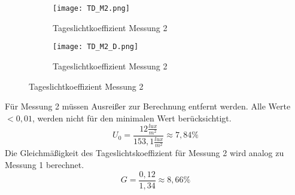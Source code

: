 \begin{figure}[H]
  \centering
  \begin{subfigure}[c]{0.5\textwidth}
      \texttt{[image: TD\_M2.png]}
      \caption{Tageslichtkoeffizient Messung 2}
      \label{fig:Tageslichtkoeffizient Messung 2}
  \end{subfigure}
  \hfill
  \begin{subfigure}[c]{0.4\textwidth}
      \texttt{[image: TD\_M2\_D.png]}
      \caption{Tageslichtkoeffizient Messung 2}
      \label{fig:Tageslichtkoeffizient Messung 2 Draufsicht}
  \end{subfigure}
  \label{fig:Messung 2 Tageslichtkoeffizient}
  \end{figure}
  Für Messung 2 müssen Ausreißer zur Berechnung entfernt werden. Alle Werte $<0,01$, werden nicht für den minimalen Wert berücksichtigt.
  $$U_0 = \frac{12\frac{lux}{m^2}}{153,1\frac{lux}{m^2}}\approx 7,84 \%$$
  Die Gleichmäßigkeit des Tageslichtskoeffizient für Messung 2 wird analog zu Messung 1 berechnet.
  $$G =\frac{0,12}{1,34}\approx 8,66\% $$
\newpage
